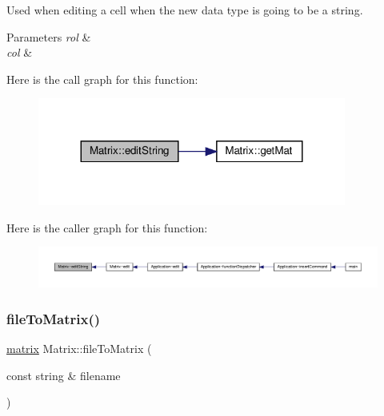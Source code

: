 Used when editing a cell when the new data type is going to be a string. 
\begin{DoxyParams}{Parameters}
{\em rol} & \\
\hline
{\em col} & \\
\hline
\end{DoxyParams}
Here is the call graph for this function\+:\nopagebreak
\begin{figure}[H]
\begin{center}
\leavevmode
\includegraphics[width=287pt]{class_matrix_a7029d8a3cd3c691b46adfd777abc880c_cgraph}
\end{center}
\end{figure}
Here is the caller graph for this function\+:\nopagebreak
\begin{figure}[H]
\begin{center}
\leavevmode
\includegraphics[width=350pt]{class_matrix_a7029d8a3cd3c691b46adfd777abc880c_icgraph}
\end{center}
\end{figure}
\mbox{\label{class_matrix_a35eb9dcb01c552fea1f5926db35339ef}} 
\subsubsection{\texorpdfstring{file\+To\+Matrix()}{fileToMatrix()}}
{\footnotesize\ttfamily \hyperlink{formula_8h_a869e2a5deeb3daa4c82d6bc91cf20d92}{matrix} Matrix\+::file\+To\+Matrix (\begin{DoxyParamCaption}\item[{const string \&}]{filename }\end{DoxyParamCaption})}

